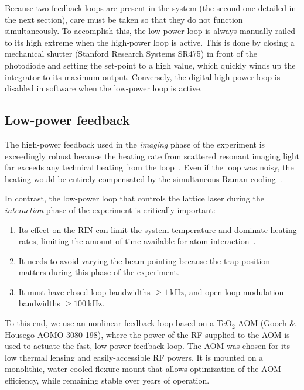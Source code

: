 \documentclass[twocolumn,aip,rsi,reprint,bibnotes]{revtex4-1}
\newcommand\unit[2]{\ensuremath{#1~\mathrm{{#2}}}}
\begin{document}
Because two feedback loops are present in the system (the second one detailed in the next section), care must be taken so that they do not function simultaneously.
To accomplish this, the low-power loop is always manually railed to its high extreme when the high-power loop is active.
This is done by closing a mechanical shutter (Stanford Research Systems SR475) in front of the photodiode and setting the set-point to a high value, which quickly winds up the integrator to its maximum output.
Conversely, the digital high-power loop is disabled in software when the low-power loop is active.

\subsection{Low-power feedback}
The high-power feedback used in the \emph{imaging} phase of the experiment is exceedingly robust because the heating rate from scattered resonant imaging light far exceeds any technical heating from the loop~\cite{Blatt2015}.
Even if the loop was noisy, the heating would be entirely compensated by the simultaneous Raman cooling~\cite{Parsons2015}.

In contrast, the low-power loop that controls the lattice laser during the \emph{interaction} phase of the experiment is critically important:
\begin{enumerate}
  \item Its effect on the RIN can limit the system temperature and dominate heating rates, limiting the amount of time available for atom interaction~\cite{Blatt2015}.
  \item It needs to avoid varying the beam pointing because the trap position matters during this phase of the experiment.
  \item It must have closed-loop bandwidths $\geq\unit{1}{kHz}$, and open-loop modulation bandwidths $\geq \unit{100}{kHz}$.
\end{enumerate}
To this end, we use an nonlinear feedback loop based on a TeO$_2$ AOM (Gooch \& Housego AOMO 3080-198), where the power of the RF supplied to the AOM is used to actuate the fast, low-power feedback loop.
The AOM was chosen for its low thermal lensing and easily-accessible RF powers.
It is mounted on a monolithic, water-cooled flexure mount that allows optimization of the AOM efficiency, while remaining stable over years of operation.
\end{document}

